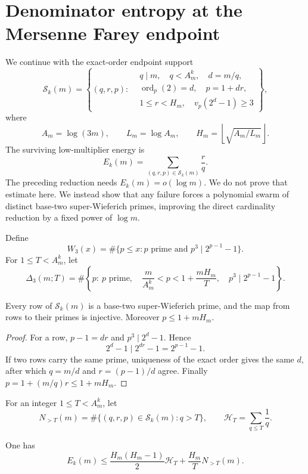 \section{Denominator entropy at the Mersenne Farey endpoint}
\label{sec:mersenne-farey-denominator-entropy}

We continue with the exact-order endpoint support
\[
 \mathcal S_k(m)=
 \left\{(q,r,p):
 \begin{aligned}
   &q\mid m,\quad q<A_m^k,\quad d=m/q,\\
   &\operatorname{ord}_p(2)=d,\quad p=1+dr,\\
   &1\le r<H_m,\quad v_p(2^d-1)\ge3
 \end{aligned}
 \right\},
\]
where
\[
 A_m=\log(3m),\qquad L_m=\log A_m,
 \qquad H_m=\left\lfloor\sqrt{A_m/L_m}\right\rfloor.
\]
The surviving low-multiplier energy is
\[
 E_k(m)=\sum_{(q,r,p)\in\mathcal S_k(m)}\frac rq.
\]
The preceding reduction needs $E_k(m)=o(\log m)$.  We do not prove that
estimate here.  We instead show that any failure forces a polynomial swarm
of distinct base-two super-Wieferich primes, improving the direct
cardinality reduction by a fixed power of $\log m$.

Define
\[
 W_3(x)=\#\{p\le x:p\text{ prime and }p^3\mid2^{p-1}-1\}.
\]
For $1\le T<A_m^k$, let
\[
 \Delta_3(m;T)=\#\left\{p:\ p\text{ prime},\quad
 \frac m{A_m^k}<p<1+\frac{mH_m}{T},\quad
 p^3\mid2^{p-1}-1\right\}.
\]

\begin{proposition}
Every row of $\mathcal S_k(m)$ is a base-two super-Wieferich prime, and the
map from rows to their primes is injective.  Moreover $p\le1+mH_m$.
\end{proposition}

\begin{proof}
For a row, $p-1=dr$ and $p^3\mid2^d-1$.  Hence
\[
 2^d-1\mid2^{dr}-1=2^{p-1}-1.
\]
If two rows carry the same prime, uniqueness of the exact order gives the
same $d$, after which $q=m/d$ and $r=(p-1)/d$ agree.  Finally
$p=1+(m/q)r\le1+mH_m$.
\end{proof}

For an integer $1\le T<A_m^k$, let
\[
 N_{>T}(m)=\#\{(q,r,p)\in\mathcal S_k(m):q>T\},
 \qquad \mathcal H_T=\sum_{q\le T}\frac1q.
\]

\begin{theorem}
\label{thm:mersenne-denominator-entropy}
One has
\[
 E_k(m)\le
 \frac{H_m(H_m-1)}2\mathcal H_T
 +\frac{H_m}{T}N_{>T}(m).
\]
\end{theorem}

